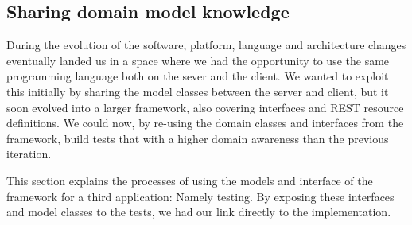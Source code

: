 \subsection{Sharing domain model knowledge}
\label{ssec:openreception-framework}
During the evolution of the software, platform, language and architecture changes eventually landed us in a space where we had the opportunity to use the same programming language both on the sever and the client. We wanted to exploit this initially by sharing the model classes between the server and client, but it soon evolved into a larger framework, also covering interfaces and REST resource definitions. We could now, by re-using the domain classes and interfaces from the framework, build tests that with a higher domain awareness than the previous iteration.\medskip

\noindent This section explains the processes of using the models and interface of the framework for a third application: Namely testing. By exposing these interfaces and model classes to the tests, we had our link directly to the implementation.

